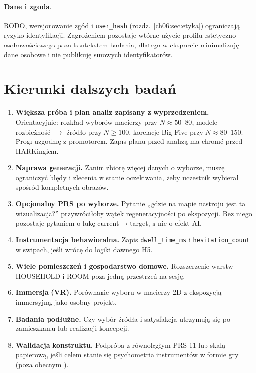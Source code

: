 \paragraph{Dane i zgoda.}
RODO, wersjonowanie zgód i \texttt{user\_hash} (rozdz.~\ref{ch06:sec:etyka}) ograniczają ryzyko identyfikacji. Zagrożeniem pozostaje wtórne użycie profilu estetyczno-osobowościowego poza kontekstem badania, dlatego w eksporcie minimalizuję dane osobowe i nie publikuję surowych identyfikatorów.

\section{Kierunki dalszych badań}
\label{ch09:sec:dalsze}

\begin{enumerate}
  \item \textbf{Większa próba i plan analiz zapisany z wyprzedzeniem.} Orientacyjnie: rozkład wyborów macierzy przy $N\!\approx\!50$--$80$, modele rozbieżność~$\rightarrow$ źródło przy $N\!\geq\!100$, korelacje Big Five przy $N\!\approx\!80$--$150$. Progi uzgodnię z promotorem. Zapis planu przed analizą ma chronić przed HARKingiem.
  \item \textbf{Naprawa generacji.} Zanim zbiorę więcej danych o wyborze, muszę ograniczyć błędy i zlecenia w stanie oczekiwania, żeby uczestnik wybierał spośród kompletnych obrazów.
  \item \textbf{Opcjonalny PRS po wyborze.} Pytanie „gdzie na mapie nastroju jest ta wizualizacja?” przywróciłoby wątek regeneracyjności po ekspozycji. Bez niego  pozostaje pytaniem o lukę current$\rightarrow$target, a nie o efekt AI.
  \item \textbf{Instrumentacja behawioralna.} Zapis \texttt{dwell\_time\_ms} i \texttt{hesitation\_count} w swipach, jeśli wrócę do logiki dawnego H5.
  \item \textbf{Wiele pomieszczeń i gospodarstwo domowe.} Rozszerzenie warstw HOUSEHOLD i ROOM poza jedną przestrzeń na sesję.
  \item \textbf{Immersja (VR).} Porównanie wyboru w macierzy 2D z ekspozycją immersyjną, jako osobny projekt.
  \item \textbf{Badania podłużne.} Czy wybór źródła i satysfakcja utrzymują się po zamieszkaniu lub realizacji koncepcji.
  \item \textbf{Walidacja konstruktu.} Podpróba z równoległym PRS-11 lub skalą papierową, jeśli celem stanie się psychometria instrumentów w formie gry (poza obecnym ).
\end{enumerate}
